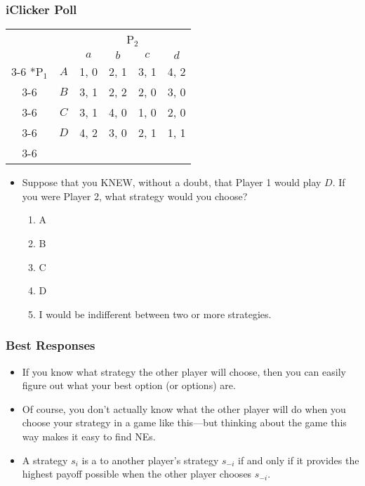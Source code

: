 \begin{frame}
\frametitle{iClicker Poll}
\begin{table}[h]
\centering
\begin{tabular}{cc|c|c|c|c|}
	& \multicolumn{1}{c}{} & \multicolumn{4}{c}{P$_2$}\\
	& \multicolumn{1}{c}{} & \multicolumn{1}{c}{$a$} & \multicolumn{1}{c}{$b$} & \multicolumn{1}{c}{$c$} & \multicolumn{1}{c}{$d$} \\\cline{3-6}
	\multirow{4}*{P$_1$}  & $A$ & 1, 0 & 2, 1 & 3, 1 & 4, 2 \\\cline{3-6}
	& $B$ & 3, 1 & 2, 2 & 2, 0 & 3, 0 \\\cline{3-6}
	& $C$ & 3, 1 & 4, 0 & 1, 0 & 2, 0 \\\cline{3-6}
	& $D$ & 4, 2 & 3, 0 & 2, 1 & 1, 1 \\\cline{3-6}
\end{tabular}
\end{table}
\begin{itemize}
\item Suppose that you KNEW, without a doubt, that Player 1 would play $D$. If you were Player 2, what strategy would you choose?
\begin{enumerate}
	\item A
	\item B
	\item C
	\item D
	\item I would be indifferent between two or more strategies.
\end{enumerate}
\end{itemize}
\end{frame}

\begin{frame}
\frametitle{Best Responses}
\begin{itemize}
	\item If you know what strategy the other player will choose, then you can easily figure out what your best option (or options) are.
	\item Of course, you don't actually know what the other player will do when you choose your strategy in a game like this---but thinking about the game this way makes it easy to find NEs.
	\item A strategy $s_i$ is a  to another player's strategy $s_{-i}$ if and only if it provides the highest payoff possible when the other player chooses $s_{-i}$.
\end{itemize}
\end{frame}

